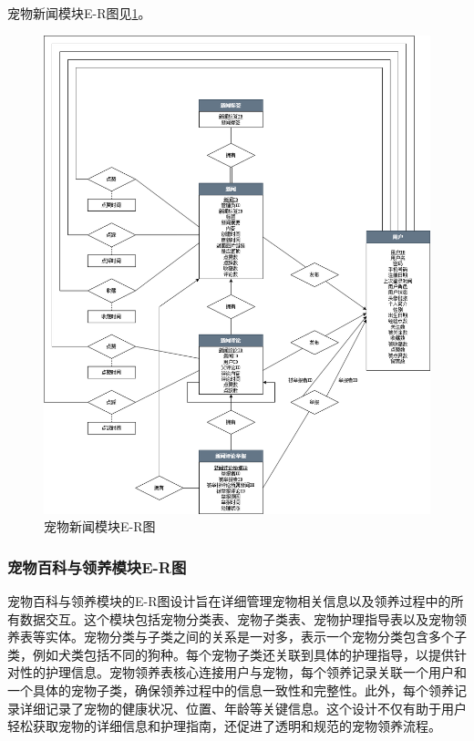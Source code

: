 宠物新闻模块E-R图见\cref{fig:PetNewsERDiagram}。

\begin{figure}[htbp]
    \centering
    \includegraphics[width=\textwidth]{figures/PetNewsERDiagram.png}
    \caption{宠物新闻模块E-R图}
    \label{fig:PetNewsERDiagram}
\end{figure}

\subsubsection{宠物百科与领养模块E-R图}

宠物百科与领养模块的E-R图设计旨在详细管理宠物相关信息以及领养过程中的所有数据交互。这个模块包括宠物分类表、宠物子类表、宠物护理指导表以及宠物领养表等实体。宠物分类与子类之间的关系是一对多，表示一个宠物分类包含多个子类，例如犬类包括不同的狗种。每个宠物子类还关联到具体的护理指导，以提供针对性的护理信息。宠物领养表核心连接用户与宠物，每个领养记录关联一个用户和一个具体的宠物子类，确保领养过程中的信息一致性和完整性。此外，每个领养记录详细记录了宠物的健康状况、位置、年龄等关键信息。这个设计不仅有助于用户轻松获取宠物的详细信息和护理指南，还促进了透明和规范的宠物领养流程。

